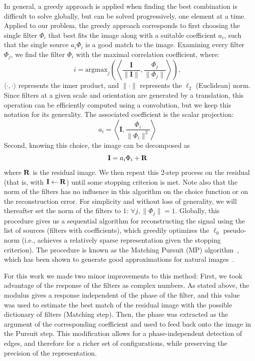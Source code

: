 \documentclass[a4paper, 10pt, twocolumns]{article}
\begin{document}
In general, a greedy approach is applied when finding the best combination is
difficult to solve globally, but can be solved progressively,
one element at a time.
Applied to our problem, the greedy approach corresponds to first choosing
the single filter $\Phi_i$ that best fits the image along with a suitable coefficient $a_i$,
such that the single source $a_i\Phi_i$ is a good match to the image.
Examining every filter $\Phi_j$, we find the filter $\Phi_i$
with the maximal correlation coefficient, where:
\begin{equation}
i = \mbox{argmax}_j \left( \left\langle \frac{\mathbf{I}}{\| \mathbf{I} \|} , \frac{
\Phi_j}{\| \Phi_j\|} \right\rangle \right),
\label{eq:coco}
\end{equation}
$\langle \cdot,\cdot \rangle$ represents the inner product, and $\| \cdot \|$
represents the $\ell_2$ (Euclidean) norm. Since filters at a given scale and orientation
are generated by a translation, this operation can be efficiently computed using a convolution,
but we keep this notation for its generality.
The associated coefficient is the scalar projection:
\begin{equation}
a_{i} = \left\langle \mathbf{I} , \frac{ \Phi_{i}}{\| \Phi_{i}\|^2} \right\rangle
\label{eq:proj}
\end{equation}
Second, knowing this choice, the image can be
decomposed as
\begin{equation}
\mathbf{I} = a_{i} \Phi_{i} + \bf{R}
\label{eq:mp0} \end{equation}
where $\bf{R}$ is the residual image.
We then repeat this 2-step process on the residual (that is, with $\mathbf{I} \leftarrow \bf{R}$)
until some stopping criterion is met.
Note also that the norm of the filters has no influence in this algorithm
on the choice function or on the reconstruction error.
For simplicity and without loss of generality,
we will thereafter set the norm of the filters to $1$: $\forall j, \| \Phi_j \| =1$.
Globally, this procedure gives us a sequential algorithm for reconstructing the signal
using the list of sources (filters with coefficients), which greedily optimizes the $\ell_0$ pseudo-norm
(i.e., achieves a relatively sparse representation given the stopping criterion).
The procedure is known as the Matching Pursuit (MP) algorithm~\citep{Mallat93},
which has been shown to generate good approximations for natural images~\citep{Perrinet10shl}.

For this work we made two minor improvements to this method:
First, we took advantage of the response of the filters as complex numbers.
As stated above, the modulus gives a response independent of the phase of the filter,
and this value was used to estimate the best match of the residual image
with the possible dictionary of filters (Matching step).
Then, the phase was extracted as the argument of the corresponding coefficient
and used to feed back onto the image in the Pursuit step.
This modification allows for a phase-independent detection of edges,
and therefore for a richer set of configurations,
while preserving the precision of the representation.
\end{document}
